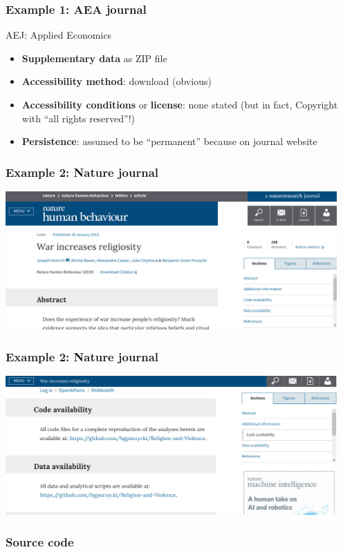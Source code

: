 \begin{frame}
\frametitle{Example 1: AEA journal}
\begin{block}{AEJ: Applied Economics}
\begin{itemize}
	\item \textbf{Supplementary data} as ZIP file
	\item \textbf{Accessibility method}: download (obvious)
	\item \textbf{Accessibility conditions} or \textbf{license}: none stated (but in fact, {\color{red}Copyright with ``all rights reserved''}!)
	\item \textbf{Persistence}: assumed to be ``permanent'' because on journal website
\end{itemize}
\end{block}
\end{frame}



\begin{frame}
\frametitle{Example 2: Nature journal}
\includegraphics[width=0.95\textwidth]{images/nature-screenshot1.png}
\end{frame}

\begin{frame}
\frametitle{Example 2: Nature journal}
\includegraphics[width=0.95\textwidth]{images/nature-screenshot2.png}
\end{frame}


\begin{frame}
\frametitle{Source code}

\end{frame}

